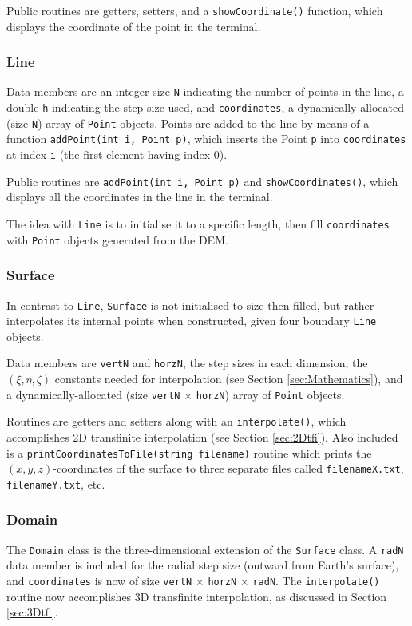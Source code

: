\documentclass{article}
\renewcommand{\t}[1]{\texttt{#1}}
\begin{document}
Public routines are getters, setters, and a \texttt{showCoordinate()} function, which displays the coordinate of the point in the terminal.

\subsubsection{Line}
Data members are an integer size \t{N} indicating the number of points in the line, a double \t{h} indicating the step size used, and \t{coordinates}, a dynamically-allocated (size \t{N}) array of \t{Point} objects. Points are added to the line by means of a function \t{addPoint(int i, Point p)}, which inserts the Point \t{p} into \t{coordinates} at index \t{i} (the first element having index 0). 

Public routines are \t{addPoint(int i, Point p)} and \t{showCoordinates()}, which displays all the coordinates in the line in the terminal.

The idea with \t{Line} is to initialise it to a specific length, then fill \t{coordinates} with \t{Point} objects generated from the DEM. 

\subsubsection{Surface}

In contrast to \t{Line}, \t{Surface} is not initialised to size then filled, but rather interpolates its internal points when constructed, given four boundary \t{Line} objects.

Data members are \t{vertN} and \t{horzN}, the step sizes in each dimension, the $(\xi, \eta, \zeta)$ constants needed for interpolation (see Section \ref{sec:Mathematics}), and a dynamically-allocated (size \t{vertN} $\times$ \t{horzN}) array of \t{Point} objects. 

Routines are getters and setters along with an \t{interpolate()}, which accomplishes 2D transfinite interpolation (see Section \ref{sec:2Dtfi}). Also included is a \t{printCoordinatesToFile(string filename)} routine which prints the $(x,y,z)$-coordinates of the surface to three separate files called \t{filenameX.txt}, \t{filenameY.txt}, etc. 

\subsubsection{Domain}

The \t{Domain} class is the three-dimensional extension of the \t{Surface} class. A \t{radN} data member is included for the radial step size (outward from Earth's surface), and \t{coordinates} is now of size \t{vertN} $\times$ \t{horzN} $\times$ \t{radN}. The \t{interpolate()} routine now accomplishes 3D transfinite interpolation, as discussed in Section \ref{sec:3Dtfi}.
\end{document}
